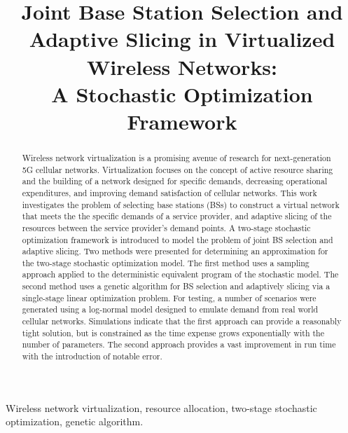\documentclass[conference]{IEEEtran}
\begin{document}
\title{Joint Base Station Selection and Adaptive Slicing in Virtualized Wireless Networks:\\A Stochastic Optimization Framework}

\author{
}

\maketitle

\begin{abstract}
Wireless network virtualization is a promising avenue of research for next-generation 5G cellular networks.  Virtualization focuses on the concept of active resource sharing and the building of a network designed for specific demands, decreasing operational expenditures, and improving demand satisfaction of cellular networks.  This work investigates the problem of selecting base stations (BSs) to construct a virtual network that meets the the specific demands of a service provider, and adaptive slicing of the resources between the service provider's demand points.  A two-stage stochastic optimization framework is introduced to model the problem of joint BS selection and adaptive slicing.  Two methods were presented for determining an approximation for the two-stage stochastic optimization model.  The first method uses a sampling approach applied to the deterministic equivalent program of the stochastic model.  The second method uses a genetic algorithm for BS selection and adaptively slicing via a single-stage linear optimization problem.  For testing, a number of scenarios were generated using a log-normal model designed to emulate demand from real world cellular networks.  Simulations indicate that the first approach can provide a reasonably tight solution, but is constrained as the time expense grows exponentially with the number of parameters.  The second approach provides a vast improvement in run time with the introduction of notable error.
\end{abstract}

\begin{IEEEkeywords}
Wireless network virtualization, resource allocation, two-stage stochastic optimization, genetic algorithm.
\end{IEEEkeywords}
\end{document}
